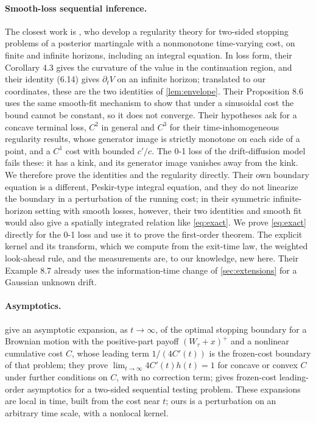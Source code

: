 \documentclass[11pt]{article}
\theoremstyle{definition}
\theoremstyle{remark}
\begin{document}
\paragraph{Smooth-loss sequential inference.}
The closest work is \citet{campbell2026}, who develop a regularity theory for two-sided stopping
problems of a posterior martingale with a nonmonotone time-varying cost, on finite and infinite
horizons, including an integral equation. In loss form, their Corollary 4.3 gives the curvature of
the value in the continuation region, and their identity (6.14) gives $\partial_t V$ on an infinite
horizon; translated to our coordinates, these are the two identities of \cref{lem:envelope}. Their
Proposition 8.6 uses the same smooth-fit mechanism to show that under a sinusoidal cost the
bound cannot be constant, so it does not converge. Their hypotheses ask for a concave terminal loss, $C^2$ in general and $C^3$ for their
time-inhomogeneous regularity results, whose generator image is strictly monotone on each side of
a point, and a $C^1$ cost with bounded $c'/c$. The 0-1 loss of
the drift-diffusion model fails these: it has a kink, and its generator image vanishes away from
the kink. We therefore prove the identities and the regularity directly. Their own boundary equation is a
different, Peskir-type integral equation, and they do not linearize the boundary in a perturbation
of the running cost; in their symmetric infinite-horizon setting with smooth losses, however, their
two identities and smooth fit would also give a spatially integrated relation like \eqref{eq:exact}.
We prove \eqref{eq:exact} directly for the 0-1 loss and use it to prove the first-order theorem. The
explicit kernel and its transform, which we compute from the exit-time law, the weighted look-ahead
rule, and the measurements are, to our knowledge, new here. Their Example 8.7 already uses the
information-time change of \cref{sec:extensions} for a Gaussian unknown drift.

\paragraph{Asymptotics.}
\citet{irle2001} give an asymptotic expansion, as $t \to \infty$, of the optimal stopping
boundary for a Brownian motion with the positive-part payoff $(W_\tau + x)^+$ and a nonlinear
cumulative cost $C$, whose leading term $1/(4C'(t))$ is the frozen-cost boundary of that problem; they prove
$\lim_{t\to\infty} 4C'(t)h(t) = 1$ for concave or convex $C$ under further conditions on $C$, with no correction term;
\citet{muravlev2020} gives frozen-cost leading-order asymptotics for a two-sided sequential
testing problem.
These expansions are local in time, built from the cost near $t$; ours is a perturbation on an
arbitrary time scale, with a nonlocal kernel.
\end{document}
